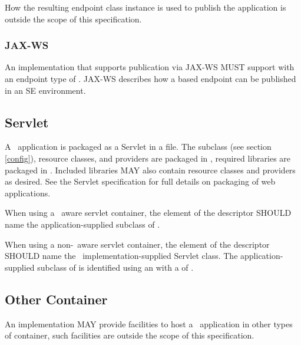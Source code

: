 How the resulting endpoint class instance is used to publish the application is outside the scope of this specification.

\subsubsection{JAX-WS}

An implementation that supports publication via JAX-WS MUST support  with an endpoint type of . JAX-WS describes how a  based endpoint can be published in an SE environment.

\subsection{Servlet}

A \jaxrs\ application is packaged as a Servlet in a  file. The  subclass (see section \ref{config}), resource classes, and providers are packaged in , required libraries are packaged in . Included libraries MAY also contain resource classes and providers as desired. See the Servlet specification for full details on packaging of web applications.

When using a \jaxrs\ aware servlet container, the  element of the  descriptor SHOULD name the application-supplied subclass of .

When using a non-\jaxrs\ aware servlet container, the  element of the  descriptor SHOULD name the \jaxrs\ implementation-supplied Servlet class. The application-supplied subclass of  is identified using an  with a  of .

\subsection{Other Container}

An implementation MAY provide facilities to host a \jaxrs\ application in other types of container, such facilities are outside the scope of this specification.